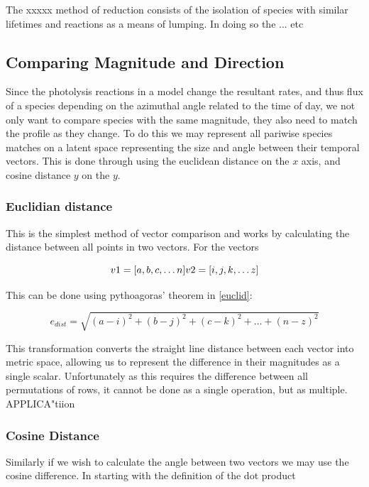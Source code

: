 The xxxxx method of reduction consists of the isolation of species with similar lifetimes and reactions as a means of lumping. In doing so the ... etc


\subsection{Comparing Magnitude and Direction}
Since the photolysis reactions in a model change the resultant rates, and thus flux of a species depending on the azimuthal angle related to the time of day, we not only want to compare species with the same magnitude, they also need to match the profile as they change. To do this we may represent all pariwise species matches on a latent space representing the size and angle between their temporal vectors. This is done through using the euclidean distance on the $x$ axis, and cosine distance $y$ on the $y$.

\subsubsection{Euclidian distance}
This is the simplest method of vector comparison and works by calculating the distance between all points in two vectors. For the vectors

\begin{equation}
v1 = [ a,b,c, \dots n ]
$$$$
v2 = [ i,j,k, \dots z ]
\end{equation}

This can be done using pythoagoras' theorem in \autoref{euclid}:

\begin{equation}
e_{dist}  = \sqrt{(a-i)^2 + (b-j)^2 + (c-k)^2 + \dots + (n-z)^2}
\label{euclid}
\end{equation}

This transformation converts the straight line distance between each vector into metric space, allowing us to represent the difference in their magnitudes as a single scalar. Unfortunately as this requires the difference between all permutations of rows, it cannot be done as a single operation, but as multiple. \\

APPLICA"tiion

\subsubsection{Cosine Distance}

Similarly if we wish to calculate the angle between two vectors we may use the cosine difference. In starting with the definition of the dot product

